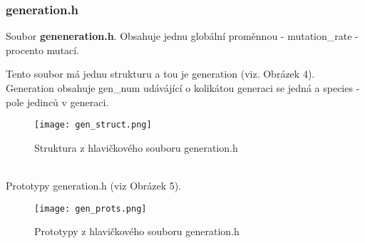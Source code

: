 \documentclass[11pt, a4paper]{article}
\begin{document}
\subsubsection{generation.h}
Soubor \textbf{geneneration.h}. Obsahuje jednu globální proměnnou - mutation\_rate - procento mutací.\par
Tento soubor má jednu strukturu a tou je generation (viz. Obrázek 4). Generation obsahuje gen\_num udávájící o kolikátou generaci se jedná a species - pole jedinců v generaci.
\begin{figure}[h]
  \texttt{[image: gen\_struct.png]}
  \caption{Struktura z hlavičkového souboru generation.h}
  \label{fig:gen_struct}
\end{figure}\\
Prototypy generation.h (viz Obrázek 5).
\begin{figure}[h]
  \texttt{[image: gen\_prots.png]}
  \caption{Prototypy z hlavičkového souboru generation.h}
  \label{fig:gen_prots}
\end{figure}\\
\end{document}
